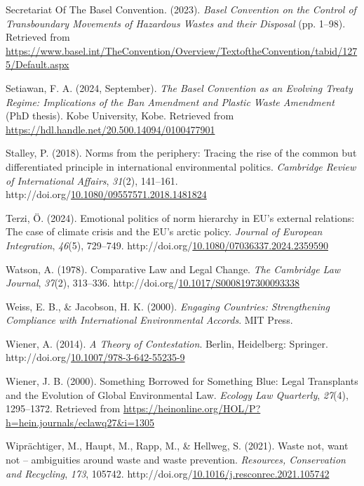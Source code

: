 \documentclass[12pt]{ulaval}
\newenvironment{CSLReferences}%
  {}%
  {\par}
\begin{document}
\begin{CSLReferences}{1}{0}
Secretariat Of The Basel Convention. (2023). \emph{Basel {Convention} on the {Control} of {Transboundary} {Movements} of {Hazardous} {Wastes} and their {Disposal}} (pp. 1--98). Retrieved from \url{https://www.basel.int/TheConvention/Overview/TextoftheConvention/tabid/1275/Default.aspx}

Setiawan, F. A. (2024, September). \emph{The {Basel} {Convention} as an {Evolving} {Treaty} {Regime}: {Implications} of the {Ban} {Amendment} and {Plastic} {Waste} {Amendment}} (PhD thesis). Kobe University, Kobe. Retrieved from \url{https://hdl.handle.net/20.500.14094/0100477901}

Stalley, P. (2018). Norms from the periphery: Tracing the rise of the common but differentiated principle in international environmental politics. \emph{Cambridge Review of International Affairs}, \emph{31}(2), 141--161. http://doi.org/\href{https://doi.org/10.1080/09557571.2018.1481824}{10.1080/09557571.2018.1481824}

Terzi, Ö. (2024). Emotional politics of norm hierarchy in {EU}'s external relations: The case of climate crisis and the {EU}'s arctic policy. \emph{Journal of European Integration}, \emph{46}(5), 729--749. http://doi.org/\href{https://doi.org/10.1080/07036337.2024.2359590}{10.1080/07036337.2024.2359590}

Watson, A. (1978). Comparative {Law} and {Legal} {Change}. \emph{The Cambridge Law Journal}, \emph{37}(2), 313--336. http://doi.org/\href{https://doi.org/10.1017/S0008197300093338}{10.1017/S0008197300093338}

Weiss, E. B., \& Jacobson, H. K. (2000). \emph{Engaging {Countries}: {Strengthening} {Compliance} with {International} {Environmental} {Accords}}. MIT Press.

Wiener, A. (2014). \emph{A {Theory} of {Contestation}}. Berlin, Heidelberg: Springer. http://doi.org/\href{https://doi.org/10.1007/978-3-642-55235-9}{10.1007/978-3-642-55235-9}

Wiener, J. B. (2000). Something {Borrowed} for {Something} {Blue}: {Legal} {Transplants} and the {Evolution} of {Global} {Environmental} {Law}. \emph{Ecology Law Quarterly}, \emph{27}(4), 1295--1372. Retrieved from \url{https://heinonline.org/HOL/P?h=hein.journals/eclawq27&i=1305}

Wiprächtiger, M., Haupt, M., Rapp, M., \& Hellweg, S. (2021). Waste not, want not -- ambiguities around waste and waste prevention. \emph{Resources, Conservation and Recycling}, \emph{173}, 105742. http://doi.org/\href{https://doi.org/10.1016/j.resconrec.2021.105742}{10.1016/j.resconrec.2021.105742}

\end{CSLReferences}


\end{document}
